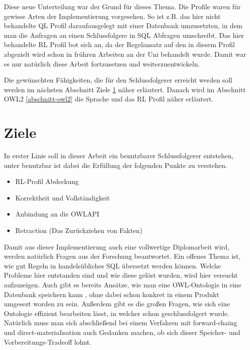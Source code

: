 Diese neue Unterteilung war der Grund für dieses Thema. Die Profile waren für gewisse Arten der Implementierung vorgesehen. So ist z.B. das hier nicht behandelte QL Profil daraufausgelegt mit einer Datenbank umzusetzten, in dem man die Anfragen an einen Schlussfolgere in SQL Abfragen umschreibt. Das hier behandelte RL Profil bot sich an, da der Regelansatz auf den in diesem Profil abgezielt wird schon in frühren Arbeiten an der Uni behandelt wurde. Damit war es nur natürlich diese Arbeit fortzusetzen und weiterzuentwickeln.

Die gewünschten Fähigkeiten, die für den Schlussfolgerer erreicht werden soll werden im nächsten Abschnitt Ziele \ref{abschnitt-ziele} näher erläutert. Danach wird im Abschnitt OWL2 \ref{abschnitt-owl2} die Sprache und das RL Profil näher erläutert.

\section{Ziele}
\label{abschnitt-ziele}

In erster Linie soll in dieser Arbeit ein benutzbarer Schlussfolgerer entstehen, unter benutzbar ist dabei die Erfüllung der folgenden Punkte zu verstehen.

\begin{itemize}
  \item RL-Profil Abdeckung
  \item Korrektheit und Vollständigkeit
  \item Anbindung an die OWLAPI
  \item Retraction (Das Zurückziehen von Fakten)
\end{itemize}


Damit aus dieser Implementierung auch eine vollwertige Diplomarbeit wird, werden natürlich Fragen aus der Forschung beantwortet. Ein offenes Thema ist, wie gut Regeln in handelsübliches SQL übersetzt werden können. Welche Probleme hier entstanden sind und wie diese gelöst wurden, wird hier versucht aufzuzeigen. Auch gibt es bereits Ansätze, wie man eine OWL-Ontologie in eine Datenbank speichern kann \cite{Kleb2009OWLDB}, ohne dabei schon konkret in einem Produkt umgesezt worden zu sein. Außerdem gibt es die großen Fragen, wie sich eine Ontologie effizient bearbeiten lässt, in welcher schon geschlussfolgert wurde. Natürlich muss man sich abschließend bei einem Verfahren mit forward-chaing und direct-materialisation auch Gedanken machen, ob sich dieser Speicher- und Vorbereitungs-Tradeoff lohnt.

